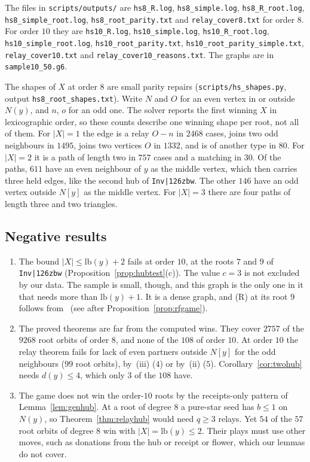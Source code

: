 \documentclass[11pt]{amsart}
\theoremstyle{definition}
\begin{document}
\begin{sloppypar}
The files in \texttt{scripts/outputs/} are \texttt{hs8\_R.log}, \texttt{hs8\_simple.log},
\texttt{hs8\_R\_root.log}, \texttt{hs8\_simple\_root.log}, \texttt{hs8\_root\_parity.txt} and
\texttt{relay\_cover8.txt} for order $8$. For order $10$ they are \texttt{hs10\_R.log},
\texttt{hs10\_simple.log}, \texttt{hs10\_R\_root.log}, \texttt{hs10\_simple\_root.log},
\texttt{hs10\_root\_parity.txt}, \texttt{hs10\_root\_parity\_simple.txt}, \texttt{relay\_cover10.txt}
and \texttt{relay\_cover10\_reasons.txt}. The graphs are in \texttt{sample10\_50.g6}.
\end{sloppypar}

The shapes of $X$ at order $8$ are small parity repairs (\texttt{scripts/hs\_shapes.py}, output
\texttt{hs8\_root\_shapes.txt}). Write $N$ and $O$ for an
even vertex in or outside $N(y)$, and $n$, $o$ for an odd one. The solver reports the first
winning $X$ in lexicographic order, so these counts describe one winning shape per root, not all
of them. For $|X|=1$ the edge is a relay $O\!-\!n$ in $2468$ cases, joins two odd neighbours in
$1495$, joins two vertices $O$ in $1332$, and is of another type in $80$. For $|X|=2$ it is a path
of length two in $757$ cases and a matching in $30$. Of the paths, $611$ have an even neighbour
of $y$ as the middle vertex, which then carries three held edges, like the second hub of
\texttt{Inv|\char126zbw}. The other $146$ have an odd vertex outside $N[y]$ as the middle
vertex. For $|X|=3$ there are four paths of length three and two triangles.

\subsection*{Negative results}
\begin{enumerate}[label=(\arabic*)]
\item The bound $|X|\le\mathrm{lb}(y)+2$ fails at order $10$, at the roots $7$ and $9$ of
\texttt{Inv|\char126zbw} (Proposition~\ref{prop:hubtest}(c)). The value $c=3$ is not
excluded by our data. The sample is small, though, and this graph is the only one in it that
needs more than $\mathrm{lb}(y)+1$. It is a dense graph, and (R) at its root $9$ follows
from~\cite[Thm.~12.29]{SP} (see after Proposition~\ref{prop:rfgame}).
\item The proved theorems are far from the computed wins. They cover $2757$ of the $9268$ root
orbits of order $8$, and none of the $108$ of order $10$. At order $10$ the relay theorem fails for
lack of even partners outside $N[y]$ for the odd neighbours ($99$ root orbits), by~(iii) ($4$)
or by~(ii) ($5$). Corollary~\ref{cor:twohub} needs $d(y)\le4$, which only $3$ of the $108$ have.
\item The game does not win the order-$10$ roots by the receipts-only pattern of
Lemma~\ref{lem:genhub}. At a root of degree $8$ a pure-star seed has $b\le1$ on $N(y)$, so
Theorem~\ref{thm:relayhub} would need $q\ge3$ relays. Yet $54$ of the $57$ root orbits of degree
$8$ win with $|X|=\mathrm{lb}(y)\le2$. Their plays must use other moves, such as donations from
the hub or receipt or flower, which our lemmas do not cover.
\end{enumerate}
\end{document}
